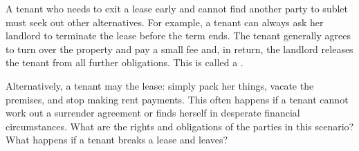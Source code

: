A tenant who needs to exit a lease early and cannot find another party to sublet
must seek out other alternatives.  For example, a tenant can always ask her
landlord to terminate the lease before the term ends.  The tenant generally
agrees to turn over the property and pay a small fee and, in return, the
landlord releases the tenant from all further obligations. This is called a
.  

Alternatively, a tenant may  the lease: simply pack
her things, vacate the premises, and
stop making rent payments.  This often happens if a tenant cannot work out a
surrender agreement or finds herself in desperate financial circumstances. 
What are the rights and obligations of the parties in this scenario? What
happens if a tenant breaks a lease and leaves?  

